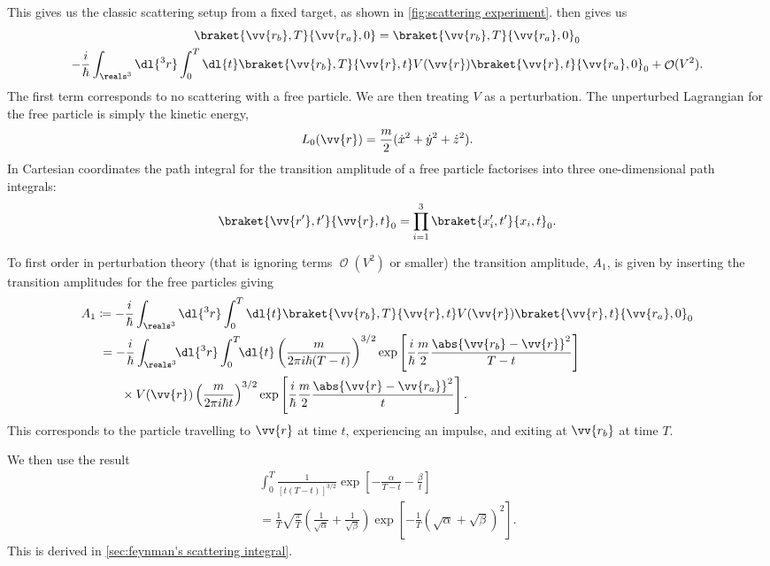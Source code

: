 \documentclass[fleqn]{NotesClass}
\newcommand*{\order}{\mathop{\mathcal{O}}}
\newcommand*{\lagrangian}{L}
\begin{document}
    This gives us the classic scattering setup from a fixed target, as shown in \cref{fig:scattering experiment}.
     then gives us
    \begin{multline}
        \braket{\vv{r_b}, T}{\vv{r_a}, 0} = \braket{\vv{r_b}, T}{\vv{r_a}, 0}_0 \\
        - \frac{i}{\hbar} \int_{\reals^3}\dl{^3r} \int_{0}^{T} \dl{t} \braket{\vv{r_b}, T}{\vv{r}, t} V(\vv{r})\braket{\vv{r}, t}{\vv{r_a}, 0}_0 + \order(V^2).
    \end{multline}
    The first term corresponds to no scattering with a free particle.
    We are then treating \(V\) as a perturbation.
    The unperturbed Lagrangian for the free particle is simply the kinetic energy,
    \begin{equation}
        \lagrangian_0(\vv{r}) = \frac{m}{2}(\dot{x}^2 + \dot{y}^2 + \dot{z}^2).
    \end{equation}
    In Cartesian coordinates the path integral for the transition amplitude of a free particle factorises into three one-dimensional path integrals:
    \begin{equation}
        \braket{\vv{r'}, t'}{\vv{r}, t}_0 = \prod_{i=1}^{3} \braket{x_i', t'}{x_i, t}_0.
    \end{equation}
    
    To first order in perturbation theory (that is ignoring terms \(\order(V^2)\) or smaller) the transition amplitude, \(A_1\), is given by inserting the transition amplitudes for the free particles giving
    \begin{align}
        A_1 &\coloneqq - \frac{i}{\hbar} \int_{\reals^3}\dl{^3r} \int_{0}^{T} \dl{t} \braket{\vv{r_b}, T}{\vv{r}, t} V(\vv{r})\braket{\vv{r}, t}{\vv{r_a}, 0}_0\\
        &\hphantom{:}= -\frac{i}{\hbar} \int_{\reals^3} \!\! \dl{^3r}\int_0^T \!\! \dl{t} \left( \frac{m}{2\pi i\hbar(T - t)} \right)^{3/2} \exp\left[ \frac{i}{\hbar}\frac{m}{2}\frac{\abs{\vv{r_b} - \vv{r}}^2}{T - t} \right]\\
        &\qquad \times V(\vv{r}) \left( \frac{m}{2\pi i\hbar t} \right)^{3/2} \exp\left[ \frac{i}{\hbar} \frac{m}{2} \frac{\abs{\vv{r} - \vv{r_a}}^2}{t} \right].
    \end{align}
    This corresponds to the particle travelling to \(\vv{r}\) at time \(t\), experiencing an impulse, and exiting at \(\vv{r_b}\) at time \(T\).
    
    We then use the result
    \begin{multline}
        \int_0^T \frac{1}{[t(T - t)]^{3/2}} \exp\left[ -\frac{\alpha}{T - t} - \frac{\beta}{t} \right]\\
        = \frac{1}{T} \sqrt{\frac{\pi}{T}} \left( \frac{1}{\sqrt{\alpha}} + \frac{1}{\sqrt{\beta}} \right) \exp\left[ -\frac{1}{T}(\sqrt{\alpha} + \sqrt{\beta})^2 \right].
    \end{multline}
    This is derived in \cref{sec:feynman's scattering integral}.
    
\end{document}
